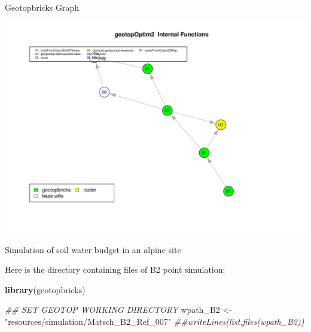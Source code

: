 \documentclass[ignorenonframetext,]{beamer}
\newenvironment{Shaded}{\begin{snugshade}}{\end{snugshade}}
\newcommand{\CommentTok}[1]{\textcolor[rgb]{0.56,0.35,0.01}{\textit{#1}}}
\newcommand{\KeywordTok}[1]{\textcolor[rgb]{0.13,0.29,0.53}{\textbf{#1}}}
\newcommand{\NormalTok}[1]{#1}
\newcommand{\StringTok}[1]{\textcolor[rgb]{0.31,0.60,0.02}{#1}}
\begin{document}
\begin{frame}{Geotopbricks Graph}
\protect\hypertarget{geotopbricks-graph}{}

\includegraphics{presentation_files/figure-beamer/unnamed-chunk-1-1.pdf}

\end{frame}

\begin{frame}[fragile]{Simulation of soil water budget in an alpine
site}
\protect\hypertarget{simulation-of-soil-water-budget-in-an-alpine-site-1}{}

Here is the directory containing files of B2 point simulation:

\begin{Shaded}
\begin{Highlighting}[]
\KeywordTok{library}\NormalTok{(geotopbricks) }

\CommentTok{## SET GEOTOP WORKING DIRECTORY}
\NormalTok{wpath_B2 <-}\StringTok{ "resources/simulation/Matsch_B2_Ref_007"} 
\CommentTok{##writeLines(list.files(wpath_B2))}
\end{Highlighting}
\end{Shaded}

\end{frame}
\end{document}
